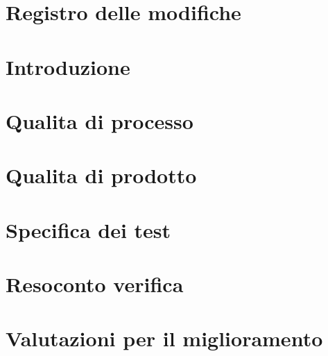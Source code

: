 \documentclass[a4paper, oneside, openany, dvipsnames, table]{article}
\begin{document}
\copertina{}

\section*{Registro delle modifiche}\label{sec:Registro-modifiche}


\newpage
\tableofcontents

\newpage
\listoftables

\newpage
\section{Introduzione}\label{sec:Introduzione}


\section{Qualita di processo}\label{sec:Qualita-di-processo}


\section{Qualita di prodotto}\label{sec:Qualita-di-prodotto}


\section{Specifica dei test}\label{sec:Specifica-dei-test}


\appendix
\newpage
\section{Resoconto verifica}\label{sec:Resoconto-verifica}


\newpage
\section{Valutazioni per il miglioramento}\label{sec:Valutazioni-per-il-miglioramento}

\end{document}
